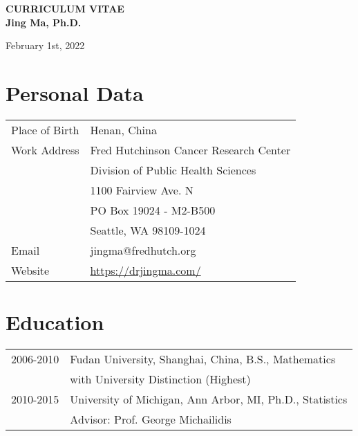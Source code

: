 \documentclass[10pt]{article}
\begin{document}
 

\begin{center}
{\large\bf 
CURRICULUM VITAE\\
Jing Ma, Ph.D.\\
}

February 1st, 2022 

\vspace{1em}

\end{center} 

\section{Personal Data}

\begin{table}[H]
\hskip0.4cm\begin{tabular}{p{2cm}p{12.5cm}}
Place of Birth & Henan, China                           \\
{Work Address}   & Fred Hutchinson Cancer Research Center \\
& Division of Public Health Sciences\\
& 1100 Fairview Ave. N\\
& PO Box 19024 - M2-B500 \\
& Seattle, WA 98109-1024 \\
Email          & jingma@fredhutch.org \\
Website        & \url{https://drjingma.com/}                          
\end{tabular}
\end{table}


\section{Education}

\begin{table}[H]
\hskip0.9cm\begin{tabular}{p{1.6cm}p{12.5cm}}
2006-2010 & Fudan University, Shanghai, China, B.S., Mathematics \\
& with University Distinction (Highest)\\
2010-2015 & University of Michigan, Ann Arbor, MI, Ph.D., Statistics \\
& {Advisor}: Prof. George Michailidis
\end{tabular}
\end{table}
\end{document}
